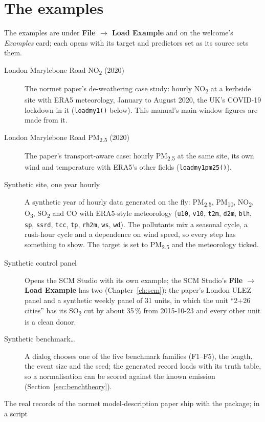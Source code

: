 \documentclass[11pt]{report}
\newcommand{\nm}{\textsf{normet}}
\newcommand{\codeunderscore}{\textunderscore\allowbreak}
\newcommand{\code}[1]{\texttt{\let\_\codeunderscore #1}}
\newcommand{\tab}[1]{\textbf{#1}}
\newcommand{\NOtwo}{NO\textsubscript{2}}
\newcommand{\PMtwo}{PM\textsubscript{2.5}}
\begin{document}
\section{The examples}\label{sec:examples}
The examples are under \tab{File $\rightarrow$ Load Example} and on the
welcome's \emph{Examples} card; each opens with its target and predictors set as its
source sets them.
\begin{description}
  \item[London Marylebone Road \NOtwo{} (2020)] The \nm{} paper's de-weathering case
        study: hourly \NOtwo{} at a kerbside site with ERA5 meteorology, January to August
        2020, the UK's COVID-19 lockdown in it (\code{load\_my1()} below). This manual's
        main-window figures are made from it.
  \item[London Marylebone Road \PMtwo{} (2020)] The paper's transport-aware case: hourly
        \PMtwo{} at the same site, its own wind and temperature with ERA5's other fields
        (\code{load\_my1\_pm25()}).
  \item[Synthetic site, one year hourly] A synthetic year of hourly data generated on the fly: \PMtwo{}, PM\textsubscript{10},
        \NOtwo{}, O\textsubscript{3}, SO\textsubscript{2} and CO with ERA5-style
        meteorology (\code{u10}, \code{v10}, \code{t2m}, \code{d2m}, \code{blh},
        \code{sp}, \code{ssrd}, \code{tcc}, \code{tp}, \code{rh2m}, \code{ws},
        \code{wd}). The pollutants mix a seasonal cycle, a rush-hour cycle and a
        dependence on wind speed, so every step has something to show. The target is set
        to \PMtwo{} and the meteorology ticked.
  \item[Synthetic control panel] Opens the SCM Studio with its own example; the SCM
        Studio's \tab{File $\rightarrow$ Load Example} has two (Chapter~\ref{ch:scm}): the
        paper's London ULEZ panel and a synthetic weekly panel of 31 units, in which the
        unit ``2+26 cities'' has its SO\textsubscript{2} cut by about 35\,\% from 2015-10-23
        and every other unit is a clean donor.
  \item[Synthetic benchmark\ldots] A dialog chooses one of the five benchmark families
        (F1--F5), the length, the event size and the seed; the generated record loads
        with its truth table, so a normalisation can be scored against the known
        emission (Section~\ref{sec:benchtheory}).
\end{description}
The real records of the \nm{} model-description paper ship with the package; in a script
\end{document}
